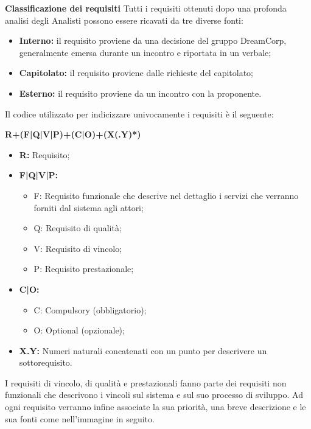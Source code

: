 \documentclass{article}
\begin{document}
    \textbf{Classificazione dei requisiti} Tutti i requisiti ottenuti dopo una profonda analisi degli Analisti possono essere ricavati da tre diverse fonti:\newline
    \begin{itemize}
    	\item \textbf{Interno:} il requisito proviene da una decisione del gruppo DreamCorp, generalmente emersa durante un incontro e riportata in un verbale;
    	\item \textbf{Capitolato:} il requisito proviene dalle richieste del capitolato;
    	\item \textbf{Esterno:} il requisito proviene da un incontro con la proponente.\newline
    \end{itemize}
    Il codice utilizzato per indicizzare univocamente i requisiti è il seguente:\newline
    \begin{center}
    	\textbf{R+(F|Q|V|P)+(C|O)+(X(.Y)*)}
    \end{center}
    \begin{itemize}
    	\item \textbf{R:} Requisito;
    	\item \textbf{F|Q|V|P:}
    	\begin{itemize}
    		\item F: Requisito funzionale che descrive nel dettaglio i servizi che verranno forniti dal sistema agli attori;
    		\item Q: Requisito di qualità;
    		\item V: Requisito di vincolo;
    		\item P: Requisito prestazionale;
    	\end{itemize}
    	\item \textbf{C|O:}
    	\begin{itemize}
    		\item C: Compulsory (obbligatorio);
    		\item O: Optional (opzionale);
    	\end{itemize}
    	\item \textbf{X.Y:} Numeri naturali concatenati con un punto per descrivere un sottorequisito.\newline
    \end{itemize}
    I requisiti di vincolo, di qualità e prestazionali fanno parte dei requisiti non funzionali che descrivono i vincoli sul sistema e sul suo processo di sviluppo.
    Ad ogni requisito verranno infine associate la sua priorità, una breve descrizione e le sua fonti come nell'immagine in seguito.\newline
    
\end{document}
